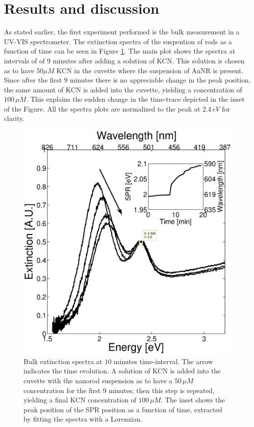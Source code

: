 \documentclass[twocolumn]{article}
\begin{document}
\section{Results and discussion}

As stated earlier, the first experiment performed is the bulk measurement in a
UV-VIS spectrometer. The extinction spectra of the suspention of rods as a
function of time can be seen in Figure \ref{fig:bulk}. The main plot shows the
spectra at intervals of of $9$ minutes after adding a solution of KCN. This
solution is chosen as to have $50\mu M$ KCN in the cuvette where the suspension
of AuNR is present. Since after the first $9$ minutes there is no appreciable
change in the peak position, the same amount of KCN is added into the cuvette,
yielding a concentration of $100\,\mu M$. This explains the sudden change in the
time-trace depicted in the inset of the Figure. All the spectra plots are
normalized to the peak at $2.4\,eV$ for clarity.

\begin{figure}[htbp]
 \centering 
 \includegraphics[width=0.95\linewidth]{plasmon_bulk.eps}
 \caption{Bulk extinction spectra at $10$ minutes time-interval. The arrow
 indicates the time evolution. A solution of KCN is added into the cuvette with
 the nanorod suspension as to have a $50\,\mu M$ concentration for the first 9
 minutes; then this step is repeated, yielding a final KCN concentration of
 $100\, \mu M$. The inset shows the peak position of the SPR position as a
 function of time, extracted by fitting the spectra with a Lorenzian.  }
 \label{fig:bulk}
\end{figure}
\end{document}
